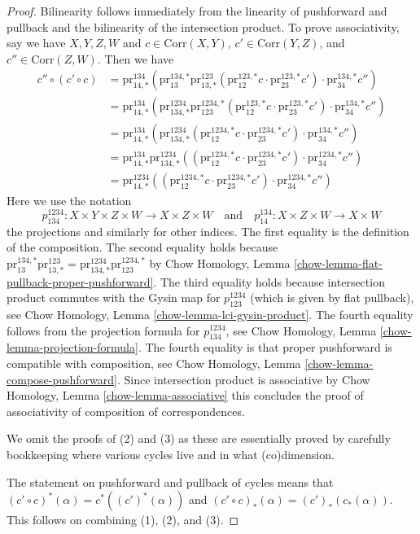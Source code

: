 \documentclass{stacks-project}
\theoremstyle{plain}
\theoremstyle{definition}
\theoremstyle{remark}
\numberwithin{equation}{subsection}
\begin{document}
\begin{proof}
Bilinearity follows immediately from the linearity of pushforward
and pullback and the bilinearity of the intersection product.
To prove associativity, say we have
$X, Y, Z, W$ and $c \in \text{Corr}(X, Y)$, $c' \in \text{Corr}(Y, Z)$, and
$c'' \in \text{Corr}(Z, W)$. Then we have
\begin{align*}
c'' \circ (c' \circ c)
& =
\text{pr}^{134}_{14, *}(
\text{pr}^{134, *}_{13}
\text{pr}^{123}_{13, *}(\text{pr}^{123, *}_{12}c \cdot
\text{pr}^{123, *}_{23}c')
\cdot \text{pr}^{134, *}_{34}c'') \\
& =
\text{pr}^{134}_{14, *}(
\text{pr}^{1234}_{134, *}
\text{pr}^{1234, *}_{123}(\text{pr}^{123, *}_{12}c \cdot
\text{pr}^{123, *}_{23}c')
\cdot \text{pr}^{134, *}_{34}c'') \\
& =
\text{pr}^{134}_{14, *}(
\text{pr}^{1234}_{134, *}
(\text{pr}^{1234, *}_{12}c \cdot
\text{pr}^{1234, *}_{23}c')
\cdot \text{pr}^{134, *}_{34}c'') \\
& =
\text{pr}^{134}_{14, *}
\text{pr}^{1234}_{134, *}
((\text{pr}^{1234, *}_{12}c \cdot
\text{pr}^{1234, *}_{23}c')
\cdot \text{pr}^{1234, *}_{34}c'') \\
& =
\text{pr}^{1234}_{14, *}(
(\text{pr}^{1234, *}_{12}c \cdot
\text{pr}^{1234, *}_{23}c') \cdot
\text{pr}^{1234, *}_{34}c'')
\end{align*}
Here we use the notation
$$
p^{1234}_{134} : X \times Y \times Z \times W \to X \times Z \times W
\quad\text{and}\quad
p^{134}_{14} : X \times Z \times W \to X \times W
$$
the projections and similarly for other indices.
The first equality is the definition of the composition.
The second equality holds because
$\text{pr}^{134, *}_{13} \text{pr}^{123}_{13, *} =
\text{pr}^{1234}_{134, *} \text{pr}^{1234, *}_{123}$
by Chow Homology, Lemma \ref{chow-lemma-flat-pullback-proper-pushforward}.
The third equality holds because intersection product commutes
with the Gysin map for $p^{1234}_{123}$ (which is given by flat pullback), see
Chow Homology, Lemma \ref{chow-lemma-lci-gysin-product}.
The fourth equality follows from the projection formula for
$p^{1234}_{134}$, see Chow Homology, Lemma \ref{chow-lemma-projection-formula}.
The fourth equality is that proper pushforward is compatible
with composition, see Chow Homology, Lemma \ref{chow-lemma-compose-pushforward}.
Since intersection product is associative by
Chow Homology, Lemma \ref{chow-lemma-associative}
this concludes the proof of associativity of composition of correspondences.

\medskip\noindent
We omit the proofs of (2) and (3) as these are essentially proved by
carefully bookkeeping where various cycles live and in what (co)dimension.

\medskip\noindent
The statement on pushforward and pullback of cycles
means that $(c' \circ c)^*(\alpha) = c^*((c')^*(\alpha))$ and
$(c' \circ c)_*(\alpha) = (c')_*(c_*(\alpha))$.
This follows on combining (1), (2), and (3).
\end{proof}
\end{document}
